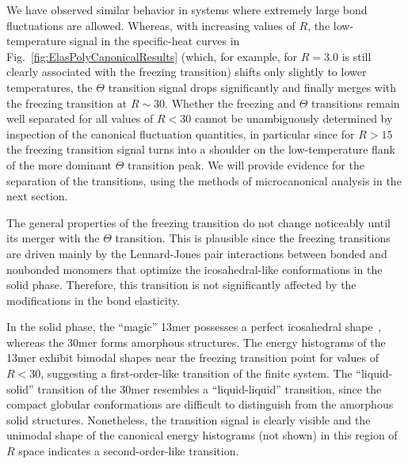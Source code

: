 \documentclass[12pt]{report}
\begin{document}
%
We have observed similar behavior in systems where extremely large bond fluctuations are allowed. Whereas, with increasing values of $R$, the low-temperature signal in the specific-heat curves in Fig.~\ref{fig:ElasPolyCanonicalResults} (which, for example, for $R=3.0$ is still clearly associated with the freezing transition) shifts only slightly to lower temperatures, the $\Theta$ transition signal drops significantly and finally merges with the freezing transition at $R\sim 30$. Whether the freezing and $\Theta$ transitions remain well separated for all values of $R < 30$ cannot be unambiguously determined by inspection of the canonical fluctuation quantities, in particular since for $R > 15$ the freezing transition signal turns into a shoulder on the low-temperature flank of the more dominant $\Theta$ transition peak. We will provide evidence for the separation of the transitions, using the methods of microcanonical analysis in the next section.

The general properties of the freezing transition do not change noticeably until its merger with the $\Theta$ transition. This is plausible since the freezing transitions
are driven mainly by the Lennard-Jones pair interactions between bonded and nonbonded monomers that optimize the icosahedral-like conformations in the solid phase. Therefore, this transition is not significantly affected by the modifications in the bond elasticity. 

In the solid phase, the ``magic'' 13mer possesses a perfect icosahedral shape~\cite{svbj1,Schnabel2009}, whereas the 30mer forms amorphous structures. The energy histograms of the 13mer exhibit bimodal shapes near the freezing transition point for values of $R <  30$, suggesting a first-order-like transition of the finite system. The ``liquid-solid'' transition of the 30mer resembles a ``liquid-liquid'' transition, since the compact globular conformations are difficult to distinguish from the amorphous solid structures. Nonetheless, the transition signal is clearly visible and the unimodal shape of the canonical energy histograms (not shown) in this region of $R$ space  indicates a second-order-like transition.
\end{document}
